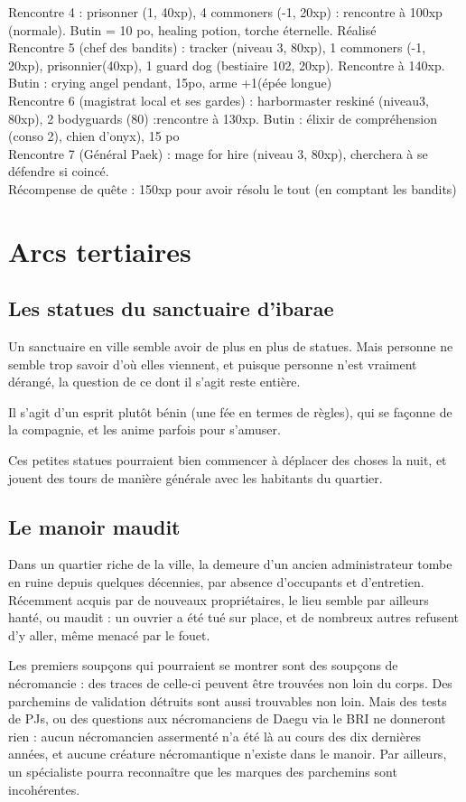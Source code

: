 \documentclass[10pt,a4paper]{book}
\begin{document}
Rencontre 4 : prisonner (1, 40xp), 4 commoners (-1, 20xp) : rencontre à 100xp (normale). Butin  = 10 po, healing potion, torche éternelle. Réalisé\\
Rencontre 5 (chef des bandits) : tracker (niveau 3, 80xp), 1 commoners (-1, 20xp), prisonnier(40xp), 1 guard dog (bestiaire 102, 20xp). Rencontre à 140xp. Butin : crying angel pendant, 15po, arme +1(épée longue)\\
Rencontre 6 (magistrat local et ses gardes) : harbormaster reskiné (niveau3, 80xp), 2 bodyguards (80) :rencontre à 130xp. Butin : élixir de compréhension (conso 2), chien d'onyx), 15 po\\
Rencontre 7 (Général Paek) : mage for hire (niveau 3, 80xp), cherchera à se défendre si coincé. \\

Récompense de quête : 150xp pour avoir résolu le tout (en comptant les bandits)
\section{Arcs tertiaires}
\subsection{Les statues du sanctuaire d'ibarae}
Un sanctuaire en ville semble avoir de plus en plus de statues. Mais personne ne semble trop savoir d'où elles viennent, et puisque personne n'est vraiment dérangé, la question de ce dont il s'agit reste entière.

Il s'agit d'un esprit plutôt bénin (une fée en termes de règles), qui se façonne de la compagnie, et les anime parfois pour s'amuser. 

Ces petites statues pourraient bien commencer à déplacer des choses la nuit, et jouent des tours de manière générale avec les habitants du quartier.

\subsection{Le manoir maudit}
Dans un quartier riche de la ville, la demeure d'un ancien administrateur tombe en ruine depuis quelques décennies, par absence d'occupants et d'entretien. Récemment acquis par de nouveaux propriétaires, le lieu semble par ailleurs hanté, ou maudit : un ouvrier a été tué sur place, et de nombreux autres refusent d'y aller, même menacé par le fouet.

Les premiers soupçons qui pourraient se montrer sont des soupçons de nécromancie : des traces de celle-ci peuvent être trouvées non loin du corps. Des parchemins de validation détruits sont aussi trouvables non loin. Mais des tests de PJs, ou des questions aux nécromanciens de Daegu via le BRI ne donneront rien : aucun nécromancien assermenté n'a été là au cours des dix dernières années, et aucune créature nécromantique n'existe dans le manoir. Par ailleurs, un spécialiste pourra reconnaître que les marques des parchemins sont incohérentes.
\end{document}
